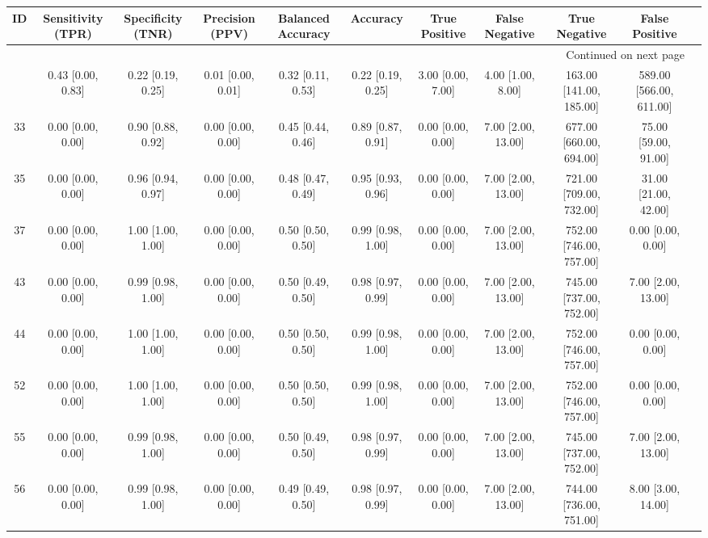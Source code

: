 \documentclass[8pt]{article}
\begin{document}
\begin{center}
\begin{footnotesize}
\begin{longtable}{|ccccccccccc|}
\toprule
 ID &  Sensitivity (TPR) &  Specificity (TNR) &    Precision (PPV) &  Balanced Accuracy &           Accuracy &      True Positive &      False Negative &            True Negative &           False Positive \\
\midrule
\endhead
\midrule
\multicolumn{10}{r}{{Continued on next page}} \\
\midrule
\endfoot

\bottomrule
\endlastfoot
 38 &  0.43 [0.00, 0.83] &  0.22 [0.19, 0.25] &  0.01 [0.00, 0.01] &  0.32 [0.11, 0.53] &  0.22 [0.19, 0.25] &  3.00 [0.00, 7.00] &   4.00 [1.00, 8.00] &  163.00 [141.00, 185.00] &  589.00 [566.00, 611.00] \\
 33 &  0.00 [0.00, 0.00] &  0.90 [0.88, 0.92] &  0.00 [0.00, 0.00] &  0.45 [0.44, 0.46] &  0.89 [0.87, 0.91] &  0.00 [0.00, 0.00] &  7.00 [2.00, 13.00] &  677.00 [660.00, 694.00] &     75.00 [59.00, 91.00] \\
 35 &  0.00 [0.00, 0.00] &  0.96 [0.94, 0.97] &  0.00 [0.00, 0.00] &  0.48 [0.47, 0.49] &  0.95 [0.93, 0.96] &  0.00 [0.00, 0.00] &  7.00 [2.00, 13.00] &  721.00 [709.00, 732.00] &     31.00 [21.00, 42.00] \\
 37 &  0.00 [0.00, 0.00] &  1.00 [1.00, 1.00] &  0.00 [0.00, 0.00] &  0.50 [0.50, 0.50] &  0.99 [0.98, 1.00] &  0.00 [0.00, 0.00] &  7.00 [2.00, 13.00] &  752.00 [746.00, 757.00] &        0.00 [0.00, 0.00] \\
 43 &  0.00 [0.00, 0.00] &  0.99 [0.98, 1.00] &  0.00 [0.00, 0.00] &  0.50 [0.49, 0.50] &  0.98 [0.97, 0.99] &  0.00 [0.00, 0.00] &  7.00 [2.00, 13.00] &  745.00 [737.00, 752.00] &       7.00 [2.00, 13.00] \\
 44 &  0.00 [0.00, 0.00] &  1.00 [1.00, 1.00] &  0.00 [0.00, 0.00] &  0.50 [0.50, 0.50] &  0.99 [0.98, 1.00] &  0.00 [0.00, 0.00] &  7.00 [2.00, 13.00] &  752.00 [746.00, 757.00] &        0.00 [0.00, 0.00] \\
 52 &  0.00 [0.00, 0.00] &  1.00 [1.00, 1.00] &  0.00 [0.00, 0.00] &  0.50 [0.50, 0.50] &  0.99 [0.98, 1.00] &  0.00 [0.00, 0.00] &  7.00 [2.00, 13.00] &  752.00 [746.00, 757.00] &        0.00 [0.00, 0.00] \\
 55 &  0.00 [0.00, 0.00] &  0.99 [0.98, 1.00] &  0.00 [0.00, 0.00] &  0.50 [0.49, 0.50] &  0.98 [0.97, 0.99] &  0.00 [0.00, 0.00] &  7.00 [2.00, 13.00] &  745.00 [737.00, 752.00] &       7.00 [2.00, 13.00] \\
 56 &  0.00 [0.00, 0.00] &  0.99 [0.98, 1.00] &  0.00 [0.00, 0.00] &  0.49 [0.49, 0.50] &  0.98 [0.97, 0.99] &  0.00 [0.00, 0.00] &  7.00 [2.00, 13.00] &  744.00 [736.00, 751.00] &       8.00 [3.00, 14.00] \\
\end{longtable}
\end{footnotesize}
\end{center}
\end{document}
